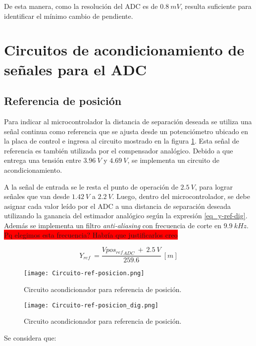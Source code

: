  De esta manera, como la resolución del ADC es de $0.8\:mV$, resulta suficiente para identificar el mínimo cambio de pendiente.


\section{Circuitos de acondicionamiento de señales para el ADC}

\subsection{Referencia de posición}

 Para indicar al microcontrolador la distancia de separación deseada se utiliza una señal continua como referencia que se ajusta desde un potenciómetro ubicado en la placa de control  e ingresa al circuito mostrado en la figura \ref{fig:circuito-ref-posicion}. Esta señal de referencia es también utilizada por el compensador analógico. Debido a que entrega una tensión entre $3.96\:V$ y $4.69\:V$, se implementa un circuito de acondicionamiento.

 A la señal de entrada se le resta el punto de operación de $2.5\:V$, para lograr señales que van desde $1.42\:V$ a $2.2\:V$. Luego, dentro del microcontrolador, se debe asignar cada valor leído por el ADC a una distancia de separación deseada utilizando la ganancia del estimador analógico según la expresión \ref{eq_y-ref-dig}. Además se implementa un filtro \textsl{anti-aliasing} con frecuencia de corte en $9.9\:kHz$. \colorbox{red}{Pq elegimos esta frecuencia? Habría que justificarlos creo}

\begin{equation} \label{eq_y-ref-dig}
	Y_{ref}\ =\frac{Vpo{s_{ref}}_{ADC}\ +\ 2.5\:V}{259.6}\:[m]
\end{equation}

\begin{figure}[H]
	\centering
	\texttt{[image: Circuito-ref-posicion.png]}
	\caption{Circuito acondicionador para referencia de posición.}

\end{figure}

\begin{figure}[H]
	\centering
	\texttt{[image: Circuito-ref-posicion\_dig.png]}
	\caption{Circuito acondicionador para referencia de posición.}
	\label{fig:circuito-ref-posicion}
\end{figure}


Se considera que:

